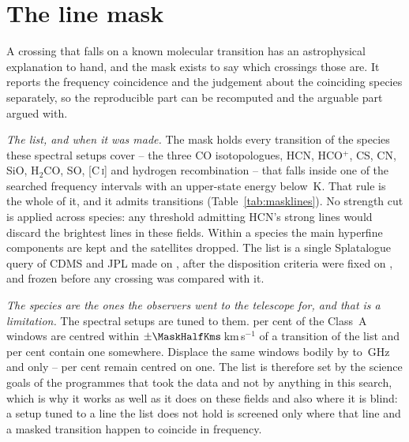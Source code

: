 \section{The line mask}
\label{app:linemask}

A crossing that falls on a known molecular transition has an astrophysical
explanation to hand, and the mask exists to say which crossings those are. It
reports the frequency coincidence and the judgement about the coinciding
species separately, so the reproducible part can be recomputed and the
arguable part argued with.

\emph{The list, and when it was made.} The mask holds every transition of the
\FrNSpec{} species these spectral setups cover -- the three CO isotopologues,
HCN, HCO$^{+}$, CS, CN, SiO, H$_2$CO, SO, [C\,\textsc{i}] and hydrogen
recombination -- that falls inside one of the \McNIsland{} searched frequency
intervals with an upper-state energy below \McEuMax\,K. That rule is the whole
of it, and it admits \FrNTrans{} transitions (Table~\ref{tab:masklines}).
No strength cut is applied across species: any threshold admitting HCN's
strong lines would discard the brightest lines in these fields. Within a
species the main hyperfine components are kept and the satellites
dropped. The list is a single Splatalogue query of CDMS and
JPL \citep{Pickett1998,CDMS2005} made on \MkListDate{}, after the disposition
criteria were fixed on \MkCritDate, and frozen before any crossing was
compared with it.

\emph{The species are the ones the observers went to the telescope for, and
that is a limitation.} The spectral setups are tuned to them. \TnCenPct{} per
cent of the \NWinA{} Class~A windows are centred within
$\pm\MaskHalfKms$\,km\,s$^{-1}$ of a transition of the list and \TnWinPct{}
per cent contain one somewhere. Displace the same windows bodily by
\TnShiftLoGHz{} to \TnShiftHiGHz\,GHz and only
\TnCtrlCenLo--\TnCtrlCenHi{} per cent remain centred on one. The list is
therefore set by the science goals of the
programmes that took the data and not by anything in this search, which is
why it works as well as it does on these fields and also where it is blind: a
setup tuned to a line the list does not hold is screened only where that line
and a masked transition happen to coincide in frequency.


